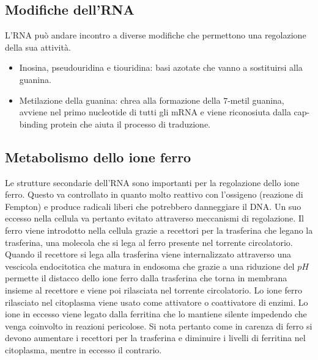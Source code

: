 \subsection{Modifiche dell'RNA}
L'RNA pu\`o andare incontro a diverse modifiche che permettono una regolazione della sua attivit\`a.
\begin{itemize}
	\item Inosina, pseudouridina e tiouridina: basi azotate che vanno a sostituirsi alla guanina.
	\item Metilazione della guanina: chrea alla formazione della $7$-metil guanina, avviene nel primo nucleotide di tutti gli mRNA e viene riconosiuta dalla cap-binding protein che
		aiuta il processo di traduzione.
\end{itemize}
\subsection{Metabolismo dello ione ferro}
Le strutture secondarie dell'RNA sono importanti per la regolazione dello ione ferro. Questo va controllato in quanto molto reattivo con l'ossigeno (reazione di Fempton) e produce 
radicali liberi che potrebbero danneggiare il DNA. Un suo eccesso nella cellula va pertanto evitato attraverso meccanismi di regolazione. Il ferro viene introdotto nella cellula 
grazie a recettori per la trasferina che legano la trasferina, una molecola che si lega al ferro presente nel torrente circolatorio. Quando il recettore si lega alla trasferina 
viene internalizzato attraverso una vescicola endocitotica che matura in endosoma che grazie a una riduzione del $pH$ permette il distacco dello ione ferro dalla trasferina che torna
in membrana insieme al recettore e viene poi rilasciata nel torrente circolatorio. Lo ione ferro rilasciato nel citoplasma viene usato come attivatore o coattivatore di enzimi. Lo
ione in eccesso viene legato dalla ferritina che lo mantiene silente impedendo che venga coinvolto in reazioni pericolose. Si nota pertanto come in carenza di ferro si devono aumentare
i recettori per la trasferina e diminuire i livelli di ferritina nel citoplasma, mentre in eccesso il contrario. 
